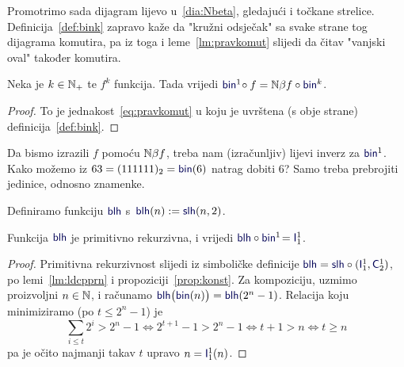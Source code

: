 
Promotrimo sada dijagram lijevo u~\eqref{dia:Nbeta}, gledajući i točkane strelice. Definicija~\ref{def:bink} zapravo kaže da "kružni odsječak" sa svake strane tog dijagrama komutira, pa iz toga i leme~\ref{lm:pravkomut} slijedi da čitav "\!vanjski oval" također komutira.

\begin{korolar}[{name=[brojevni-brojevni dijagram komutira]}]\label{kor:binf=Nbetafbin}
Neka je $k\in{\mathbb N}_+$ te $f^k$ funkcija. Tada vrijedi
    $\f{bin}^1\!\circ f=\N\beta f\circ\f{bin}^k$.
\end{korolar}
\begin{proof}
To je jednakost~\eqref{eq:pravkomut} u koju je uvrštena (s obje strane) definicija~\ref{def:bink}.
\end{proof}


Da bismo izrazili $f$ pomoću ${\mathbb N}\beta f$, treba nam (izračunljiv) lijevi inverz za $\f{bin}^1$. Kako možemo iz $63=(111111)_2=\f{bin}(6)$ natrag dobiti $6$? Samo treba prebrojiti jedinice, odnosno znamenke.

\begin{lema}[{name=[primitivna rekurzivnost i specifikacija duljine binarnog zapisa]}]\label{lm:blh}
Definiramo funkciju $\f{blh}$ s\, $\f{blh}(n):=\f{slh}(n,2)$. 

Funkcija $\f{blh}$ je primitivno rekurzivna, i vrijedi $\f{blh}\circ\f{bin}^1\!=\f I_1^1$.
\end{lema}
\begin{proof}
Primitivna rekurzivnost slijedi iz simboličke definicije $\f{blh}=\f{slh}\circ(\f I_1^1,\f C_2^1)$, po lemi~\ref{lm:ldcpprn} i propoziciji~\ref{prop:konst}.
Za kompoziciju, uzmimo proizvoljni $n\in{\mathbb N}$, i računamo $\f{blh}\bigl(\f{bin}(n)\bigr)=\f{blh}(2^n-1)$. Relacija koju minimiziramo (po $t\le 2^n-1$) je
\begin{equation}
    \textstyle\sum_{i\le t}2^i>2^n-1
    \Longleftrightarrow
    2^{t+1}-1>2^n-1
    \Longleftrightarrow
    t+1>n
    \Longleftrightarrow
    t\ge n
\end{equation}
pa je očito najmanji takav $t$ upravo $n=\f I_1^1(n)$.\qedhere
\end{proof}

